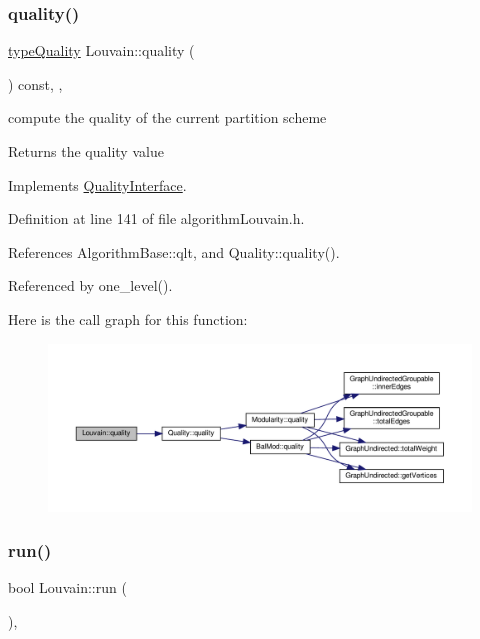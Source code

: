 \subsubsection{\texorpdfstring{quality()}{quality()}}
{\footnotesize\ttfamily \hyperlink{qualityInterface_8h_a15a3ec6041e6e02d00d2eff22c20fd94}{type\+Quality} Louvain\+::quality (\begin{DoxyParamCaption}{ }\end{DoxyParamCaption}) const\hspace{0.3cm}{\ttfamily [inline]}, {\ttfamily [private]}, {\ttfamily [virtual]}}

compute the quality of the current partition scheme \begin{DoxyReturn}{Returns}
the quality value 
\end{DoxyReturn}


Implements \hyperlink{classQualityInterface_a1c40b3e5e51d8ed2a4390b3cb0164f0a}{Quality\+Interface}.



Definition at line 141 of file algorithm\+Louvain.\+h.



References Algorithm\+Base\+::qlt, and Quality\+::quality().



Referenced by one\+\_\+level().

Here is the call graph for this function\+:
\nopagebreak
\begin{figure}[H]
\begin{center}
\leavevmode
\includegraphics[width=350pt]{classLouvain_ae328a55f83e485adb14a501bfb704d75_cgraph}
\end{center}
\end{figure}
\mbox{\label{classLouvain_ad43da46797e9e0ed91dca7fefd428148}} 
\subsubsection{\texorpdfstring{run()}{run()}}
{\footnotesize\ttfamily bool Louvain\+::run (\begin{DoxyParamCaption}{ }\end{DoxyParamCaption})\hspace{0.3cm}{\ttfamily [inline]}, {\ttfamily [virtual]}}

